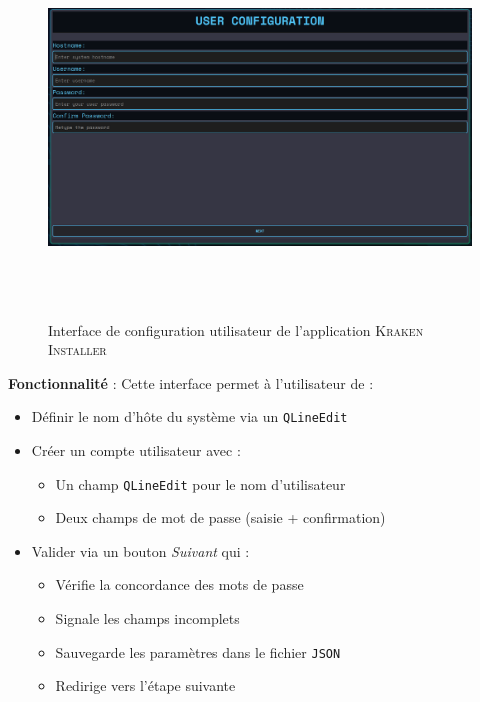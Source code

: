 \begin{figure}[H]
  \centering
  \includegraphics[width=1\textwidth, height=10cm]{images_pfe/user.png}
  \caption{Interface de configuration utilisateur de l'application \textsc{Kraken Installer}}
  \label{fig:userpage}
\end{figure}


\textbf{Fonctionnalité} : Cette interface permet à l'utilisateur de :
\begin{itemize}
    \item Définir le nom d'hôte du système via un \texttt{QLineEdit}
    \item Créer un compte utilisateur avec :
    \begin{itemize}
        \item Un champ \texttt{QLineEdit} pour le nom d'utilisateur
        \item Deux champs de mot de passe (saisie + confirmation)
    \end{itemize}
    \item Valider via un bouton \textit{Suivant} qui :
    \begin{itemize}
        \item Vérifie la concordance des mots de passe
        \item Signale les champs incomplets
        \item Sauvegarde les paramètres dans le fichier \texttt{JSON}
        \item Redirige vers l'étape suivante
    \end{itemize}
\end{itemize}

